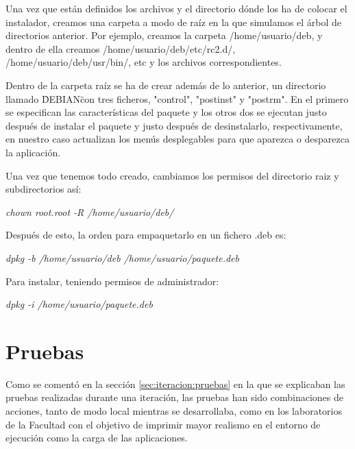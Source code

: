 


Una vez que están definidos los archivos y el directorio dónde los ha de colocar el instalador, creamos una carpeta a modo de raíz en la que simulamos el árbol de directorios anterior. Por ejemplo, creamos la carpeta /home/usuario/deb, y dentro de ella creamos /home/usuario/deb/etc/rc2.d/, /home/usuario/deb/usr/bin/, etc y los archivos correspondientes.
\newline

Dentro de la carpeta raíz se ha de crear además de lo anterior, un directorio llamado \"DEBIAN\" con tres ficheros, "control", "postinst" y "postrm". En el primero se especifican las características del paquete y los otros dos se ejecutan justo después de instalar el paquete y justo después de desinstalarlo, respectivamente, en nuestro caso actualizan los menús desplegables para que aparezca o desparezca la aplicación.
\newline

Una vez que tenemos todo creado, cambiamos los permisos del directorio raiz y subdirectorios así:

\begin{center}
    \emph{chown root.root -R /home/usuario/deb/}
\end{center}

Después de esto, la orden para empaquetarlo en un fichero .deb es:

\begin{center}
    \emph{dpkg -b /home/usuario/deb /home/usuario/paquete.deb}
\end{center}

Para instalar, teniendo permisos de administrador:

\begin{center}
    \emph{dpkg -i /home/usuario/paquete.deb}
\end{center}




\section{Pruebas}
\label{sec:implementacion:pruebas}

Como se comentó en la sección \ref{sec:iteracion:pruebas} en la que se explicaban las pruebas realizadas durante una iteración, las pruebas han sido combinaciones de acciones, tanto de modo local mientras se desarrollaba, como en los laboratorios de la Facultad con el objetivo de imprimir mayor realismo en el entorno de ejecución como la carga de las aplicaciones. 


